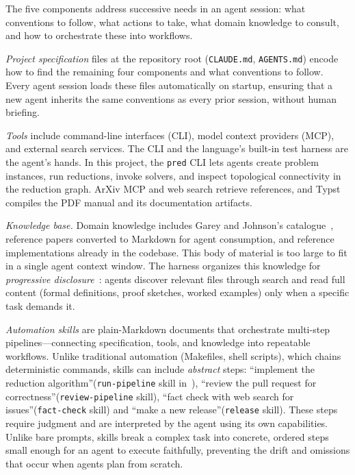 \documentclass[conference]{IEEEtran}
\begin{document}
The five components address successive needs in an agent session: what conventions to follow, what actions to take, what domain knowledge to consult, and how to orchestrate these into workflows.

\emph{Project specification} files at the repository root (\texttt{CLAUDE.md}, \texttt{AGENTS.md}) encode how to find the remaining four components and what conventions to follow.
Every agent session loads these files automatically on startup, ensuring that a new agent inherits the same conventions as every prior session, without human briefing.

\emph{Tools} include command-line interfaces (CLI), model context providers (MCP), and external search services.
The CLI and the language's built-in test harness are the agent's hands.
In this project, the \texttt{pred} CLI lets agents create problem instances, run reductions, invoke solvers, and inspect topological connectivity in the reduction graph.
ArXiv MCP and web search retrieve references, and Typst compiles the PDF manual and its documentation artifacts.

\emph{Knowledge base.}
Domain knowledge includes Garey and Johnson's catalogue~\cite{garey1979}, reference papers converted to Markdown for agent consumption, and reference implementations already in the codebase.
This body of material is too large to fit in a single agent context window.
The harness organizes this knowledge for \emph{progressive disclosure}~\cite{Nielsen2006ProgressiveDisclosure}: agents discover relevant files through search and read full content (formal definitions, proof sketches, worked examples) only when a specific task demands it.

\emph{Automation skills} are plain-Markdown documents that orchestrate multi-step pipelines---connecting specification, tools, and knowledge into repeatable workflows.
Unlike traditional automation (Makefiles, shell scripts), which chains deterministic commands, skills can include \emph{abstract} steps: ``implement the reduction algorithm''(\texttt{run-pipeline} skill in~), ``review the pull request for correctness''(\texttt{review-pipeline} skill), ``fact check with web search for issues''(\texttt{fact-check} skill) and ``make a new release''(\texttt{release} skill).
These steps require judgment and are interpreted by the agent using its own capabilities.
Unlike bare prompts, skills break a complex task into concrete, ordered steps small enough for an agent to execute faithfully, preventing the drift and omissions that occur when agents plan from scratch.
\end{document}
